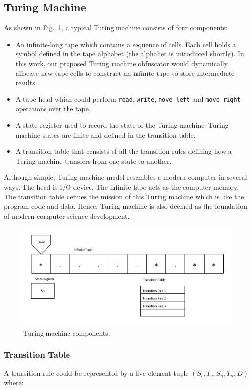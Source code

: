 \documentclass[lnicst]{svmultln}
\newcommand{\F}{Fig.}
\begin{document}
\subsection{Turing Machine}
As shown in \F~\ref{fig:three}, a typical Turing machine consists of four
components:
\begin{itemize}
  \item An infinite-long tape which contains a sequence of cells. Each cell
    holds a symbol defined in the tape alphabet (the alphabet is introduced
    shortly). In this work, our proposed Turing machine obfuscator would
    dynamically allocate new tape cells to construct an infinite tape to store
    intermediate results.
  \item A tape head which could perform \texttt{read}, \texttt{write},
    \texttt{move left} and \texttt{move right} operations over the tape.
  \item A state register used to record the state of the Turing machine. Turing
    machine states are finite and defined in the transition table.
  \item A transition table that consists of all the transition rules defining
    how a Turing machine transfers from one state to another.
\end{itemize}

Although simple, Turing machine model resembles a modern computer in several
ways. The head is I/O device. The infinite tape acts as the computer memory. The
transition table defines the mission of this Turing machine which is like the
program code and data. Hence, Turing machine is also deemed as the foundation of
modern computer science development.

\begin{figure}
 \includegraphics[width=0.9\linewidth]{TM.pdf}
 \caption{Turing machine components.}
 \label{fig:three}
\end{figure}

\subsubsection{Transition Table}
A transition rule could be represented by a five-element tuple $(S_c, T_c, S_n,
T_n, D)$ where:
\end{document}
